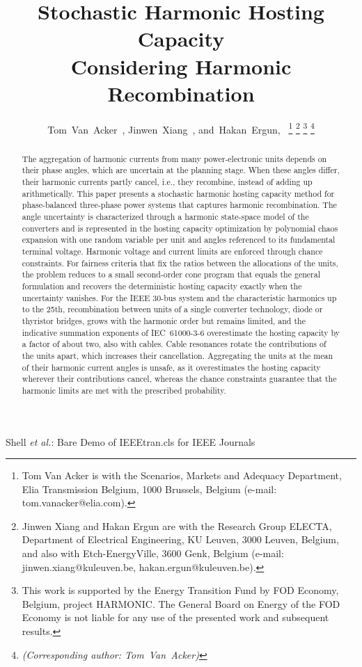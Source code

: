 \documentclass[journal]{IEEEtran}
\begin{document}
\title{Stochastic Harmonic Hosting Capacity \\ Considering Harmonic Recombination}
\author{Tom~Van~Acker~,%
        Jinwen~Xiang~,%
        and~Hakan~Ergun,~%
\thanks{Tom Van Acker is with the Scenarios, Markets and Adequacy Department, Elia Transmission Belgium, 1000 Brussels, Belgium (e-mail: tom.vanacker@elia.com).}%
\thanks{Jinwen Xiang and Hakan Ergun are with the Research Group ELECTA, Department of Electrical Engineering, KU Leuven, 3000 Leuven, Belgium, and also with Etch-EnergyVille, 3600 Genk, Belgium (e-mail: jinwen.xiang@kuleuven.be, hakan.ergun@kuleuven.be).}
\thanks{This work is supported by the Energy Transition Fund by FOD Economy, Belgium, project HARMONIC. The General Board on Energy of the FOD Economy is not liable for any use of the presented work and subsequent results.}
\thanks{\textit{(Corresponding author: Tom~Van~Acker)}}}

%
{Shell \MakeLowercase{\textit{et al.}}: Bare Demo of IEEEtran.cls for IEEE Journals}

\maketitle

\begin{abstract}
The aggregation of harmonic currents from many power-electronic units depends on their phase angles, which are uncertain at the planning stage. When these angles differ, their harmonic currents partly cancel, i.e., they recombine, instead of adding up arithmetically. This paper presents a stochastic harmonic hosting capacity method for phase-balanced three-phase power systems that captures harmonic recombination. The angle uncertainty is characterized through a harmonic state-space model of the converters and is represented in the hosting capacity optimization by polynomial chaos expansion with one random variable per unit and angles referenced to its fundamental terminal voltage. Harmonic voltage and current limits are enforced through chance constraints. For fairness criteria that fix the ratios between the allocations of the units, the problem reduces to a small second-order cone program that equals the general formulation and recovers the deterministic hosting capacity exactly when the uncertainty vanishes. For the IEEE 30-bus system and the characteristic harmonics up to the 25th, recombination between units of a single converter technology, diode or thyristor bridges, grows with the harmonic order but remains limited, and the indicative summation exponents of IEC~61000-3-6 overestimate the hosting capacity by a factor of about two, also with cables. Cable resonances rotate the contributions of the units apart, which increases their cancellation. Aggregating the units at the mean of their harmonic current angles is unsafe, as it overestimates the hosting capacity wherever their contributions cancel, whereas the chance constraints guarantee that the harmonic limits are met with the prescribed probability.
\end{abstract}
\end{document}
